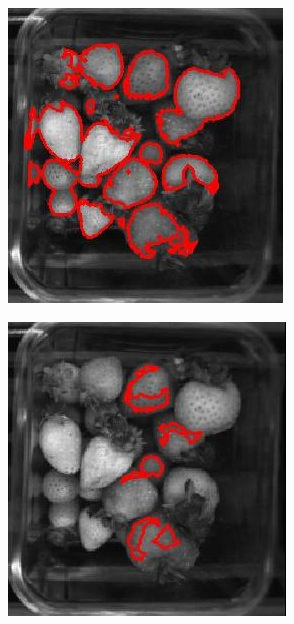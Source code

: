 \documentclass[fleqn,twoside,12pt]{report}
\begin{document}
\begin{figure}[ht]
	\begin{subfigure}{.30\textwidth}
		\centering
		\includegraphics[width=.9\linewidth]{over_light.jpg}
		\caption{}
		\label{fig:over_light}
	\end{subfigure}%
	\begin{subfigure}{.30\textwidth}
		\centering
		\includegraphics[width=.9\linewidth]{over_light_diff.jpg}

\end{subfigure}
\end{figure}
\end{document}
